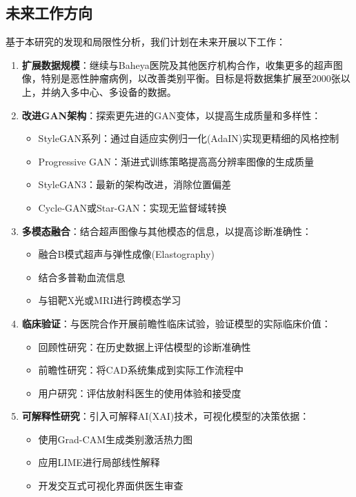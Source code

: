 \documentclass[supercite]{../Hust-undergraduate-translation/Experimental_Report}
\theoremstyle{definition}
\begin{document}
\subsection{未来工作方向}

基于本研究的发现和局限性分析，我们计划在未来开展以下工作：

\begin{enumerate}
\item \textbf{扩展数据规模}：继续与Baheya医院及其他医疗机构合作，收集更多的超声图像，特别是恶性肿瘤病例，以改善类别平衡。目标是将数据集扩展至2000张以上，并纳入多中心、多设备的数据。

\item \textbf{改进GAN架构}：探索更先进的GAN变体，以提高生成质量和多样性：
   \begin{itemize}
   \item StyleGAN系列：通过自适应实例归一化(AdaIN)实现更精细的风格控制
   \item Progressive GAN：渐进式训练策略提高高分辨率图像的生成质量
   \item StyleGAN3：最新的架构改进，消除位置偏差
   \item Cycle-GAN或Star-GAN：实现无监督域转换
   \end{itemize}

\item \textbf{多模态融合}：结合超声图像与其他模态的信息，以提高诊断准确性：
   \begin{itemize}
   \item 融合B模式超声与弹性成像(Elastography)
   \item 结合多普勒血流信息
   \item 与钼靶X光或MRI进行跨模态学习
   \end{itemize}

\item \textbf{临床验证}：与医院合作开展前瞻性临床试验，验证模型的实际临床价值：
   \begin{itemize}
   \item 回顾性研究：在历史数据上评估模型的诊断准确性
   \item 前瞻性研究：将CAD系统集成到实际工作流程中
   \item 用户研究：评估放射科医生的使用体验和接受度
   \end{itemize}

\item \textbf{可解释性研究}：引入可解释AI(XAI)技术，可视化模型的决策依据：
   \begin{itemize}
   \item 使用Grad-CAM生成类别激活热力图
   \item 应用LIME进行局部线性解释
   \item 开发交互式可视化界面供医生审查
   \end{itemize}


\end{enumerate}
\end{document}
